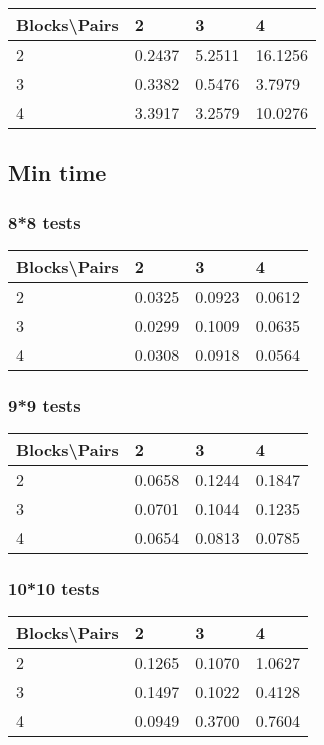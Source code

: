 \documentclass[12pt, a4paper]{article}
\begin{document}
				\begin{tabular}[h]{|l|l|l|l|}
				\hline
				Blocks\textbackslash Pairs & 2 & 3 & 4 \\
				\hline
				2 & 0.2437 & 5.2511 & 16.1256 \\
				\hline
				3 & 0.3382 & 0.5476 & 3.7979 \\
				\hline
				4 & 3.3917 & 3.2579 & 10.0276 \\
				\hline
				\end{tabular}


		\subsection{Min time}

			\subsubsection{8*8 tests}

				\begin{tabular}[h]{|l|l|l|l|}
				\hline
				Blocks\textbackslash Pairs & 2 & 3 & 4 \\
				\hline
				2 & 0.0325 & 0.0923 & 0.0612 \\
				\hline
				3 &	0.0299 & 0.1009 & 0.0635 \\
				\hline
				4 & 0.0308 & 0.0918 & 0.0564 \\
				\hline
				\end{tabular}

			\subsubsection{9*9 tests}

				\begin{tabular}[h]{|l|l|l|l|}
				\hline
				Blocks\textbackslash Pairs & 2 & 3 & 4 \\
				\hline
				2 & 0.0658 & 0.1244 & 0.1847 \\
				\hline
				3 & 0.0701 & 0.1044 & 0.1235 \\
				\hline
				4 & 0.0654 & 0.0813 & 0.0785 \\
				\hline
				\end{tabular}

			\subsubsection{10*10 tests}

				\begin{tabular}[h]{|l|l|l|l|}
				\hline
				Blocks\textbackslash Pairs & 2 & 3 & 4 \\
				\hline
				2 & 0.1265 & 0.1070 & 1.0627 \\
				\hline
				3 & 0.1497 & 0.1022 & 0.4128 \\
				\hline
				4 & 0.0949 & 0.3700 & 0.7604 \\
				\hline
				\end{tabular}
\end{document}
